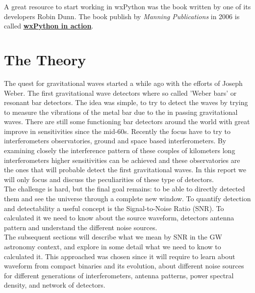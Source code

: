 \documentclass[11pt,fleqn]{book} %
\begin{document}
\begin{remark}
	A great resource to start working in wxPython was the book written by one of its developers Robin Dunn. The book publish by \emph{Manning Publications} in 2006 is called \href{http://www.manning.com/rappin/}{\textbf{wxPython in action}}.

\end{remark}










\chapter{The Theory}


The quest for  gravitational waves started a while ago with the efforts of Joseph Weber. The first gravitational wave detectors where so called 'Weber bars' or resonant bar detectors. The idea was simple, to try to detect the waves by trying to measure the vibrations of the metal bar due to the in passing gravitational waves. There are still some functioning bar detectors around the world with great improve in sensitivities since the mid-60s. Recently the focus have to try to interferometers observatories, ground and space based interferometers. By examining closely the interference pattern of these couples of kilometers long interferometers higher sensitivities can be achieved and these observatories are the ones that  will probable detect the first gravitational waves. In this report we will only focus and discuss the peculiarities of these type of detectors.\\ 


The challenge is hard, but the final goal remains: to be able to directly detected them and see the universe through a complete new window. To quantify detection and detectability a useful concept is the Signal-to-Noise Ratio (SNR). To calculated it we need to know about the source waveform, detectors antenna pattern and understand the different noise sources.\\

The subsequent sections will describe what we mean by SNR in the GW astronomy context, and explore in some detail what we need to know to calculated it. This approached was chosen since it will require  to learn about waveform from compact binaries and its evolution, about different noise sources for different generations of interferometers, antenna patterns, power spectral density, and network of detectors.\\ 
\end{document}
